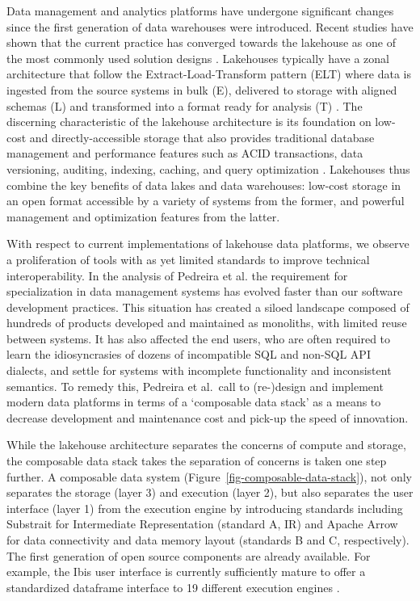 \documentclass[
  authoryear]{elsarticle}
\begin{document}
Data management and analytics platforms have undergone significant
changes since the first generation of data warehouses were introduced.
Recent studies have shown that the current practice has converged
towards the lakehouse as one of the most commonly used solution designs
\citep{armbrust2021lakehouse, hai2023data, harby2022data}. Lakehouses
typically have a zonal architecture that follow the
Extract-Load-Transform pattern (ELT) where data is ingested from the
source systems in bulk (E), delivered to storage with aligned schemas
(L) and transformed into a format ready for analysis (T)
\citep{hai2023data}. The discerning characteristic of the lakehouse
architecture is its foundation on low-cost and directly-accessible
storage that also provides traditional database management and
performance features such as ACID transactions, data versioning,
auditing, indexing, caching, and query optimization
\citep{armbrust2021lakehouse}. Lakehouses thus combine the key benefits
of data lakes and data warehouses: low-cost storage in an open format
accessible by a variety of systems from the former, and powerful
management and optimization features from the latter.

With respect to current implementations of lakehouse data platforms, we
observe a proliferation of tools with as yet limited standards to
improve technical interoperability. In the analysis of Pedreira et al.
\citep{pedreira2023composable} the requirement for specialization in
data management systems has evolved faster than our software development
practices. This situation has created a siloed landscape composed of
hundreds of products developed and maintained as monoliths, with limited
reuse between systems. It has also affected the end users, who are often
required to learn the idiosyncrasies of dozens of incompatible SQL and
non-SQL API dialects, and settle for systems with incomplete
functionality and inconsistent semantics. To remedy this, Pedreira et
al.~call to (re-)design and implement modern data platforms in terms of
a `composable data stack' as a means to decrease development and
maintenance cost and pick-up the speed of innovation.

While the lakehouse architecture separates the concerns of compute and
storage, the composable data stack takes the separation of concerns is
taken one step further. A composable data system
(Figure~\ref{fig-composable-data-stack}), not only separates the storage
(layer 3) and execution (layer 2), but also separates the user interface
(layer 1) from the execution engine by introducing standards including
Substrait for Intermediate Representation (standard A, IR) and Apache
Arrow for data connectivity and data memory layout (standards B and C,
respectively). The first generation of open source components are
already available. For example, the Ibis user interface is currently
sufficiently mature to offer a standardized dataframe interface to 19
different execution engines \citep{ibisproject}.
\end{document}
